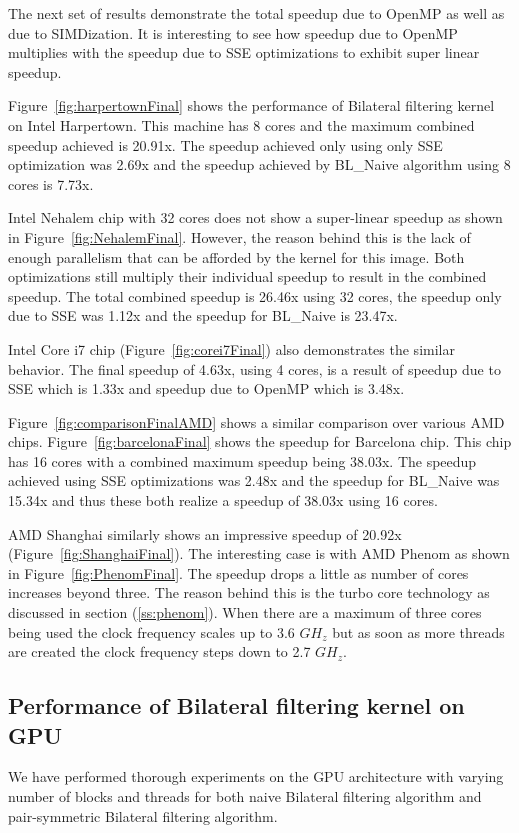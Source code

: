 \documentclass{IEEEtran}
\begin{document}
The next set of results demonstrate the total speedup due to OpenMP as well as due to SIMDization. It is interesting to see how speedup due to OpenMP multiplies with the speedup due to SSE optimizations to exhibit super linear speedup.

Figure~\ref{fig:harpertownFinal} shows the performance of Bilateral filtering kernel on Intel Harpertown. This machine has 8 cores and the maximum combined speedup achieved is 20.91x. The speedup achieved only using only SSE optimization was 2.69x and the speedup achieved by BL\_Naive algorithm using 8 cores is 7.73x.

Intel Nehalem chip with 32 cores does not show a super-linear speedup as shown in Figure~\ref{fig:NehalemFinal}. However, the reason behind this is the lack of enough parallelism that can be afforded by the kernel for this image. Both optimizations still multiply their individual speedup to result in the combined speedup. The total combined speedup is 26.46x using 32 cores, the speedup only due to SSE was 1.12x and the speedup for BL\_Naive is 23.47x.

Intel Core i7 chip (Figure~\ref{fig:corei7Final}) also demonstrates the similar behavior. The final speedup of 4.63x, using 4 cores, is a result of speedup due to SSE which is 1.33x and speedup due to OpenMP which is 3.48x. 

Figure~\ref{fig:comparisonFinalAMD} shows a similar comparison over various AMD chips. Figure~\ref{fig:barcelonaFinal} shows the speedup for Barcelona chip. This chip has 16 cores with a combined maximum speedup being 38.03x. The speedup achieved using SSE optimizations was 2.48x and the speedup for BL\_Naive was 15.34x and thus these both realize a speedup of 38.03x using 16 cores.

AMD Shanghai similarly shows an impressive speedup of 20.92x (Figure~\ref{fig:ShanghaiFinal}). The interesting case is with AMD Phenom as shown in Figure~\ref{fig:PhenomFinal}. The speedup drops a little as number of cores increases beyond three. The reason behind this is the turbo core technology as discussed in section (\ref{ss:phenom}). When there are a maximum of three cores being used the clock frequency scales up to 3.6 $GH_z$ but as soon as more threads are created the clock frequency steps down to 2.7 $GH_z$. 

\subsection{Performance of Bilateral filtering kernel on GPU}
We have performed thorough experiments on the GPU architecture with varying number of blocks and threads for both naive Bilateral filtering algorithm and pair-symmetric Bilateral filtering algorithm.
\end{document}
